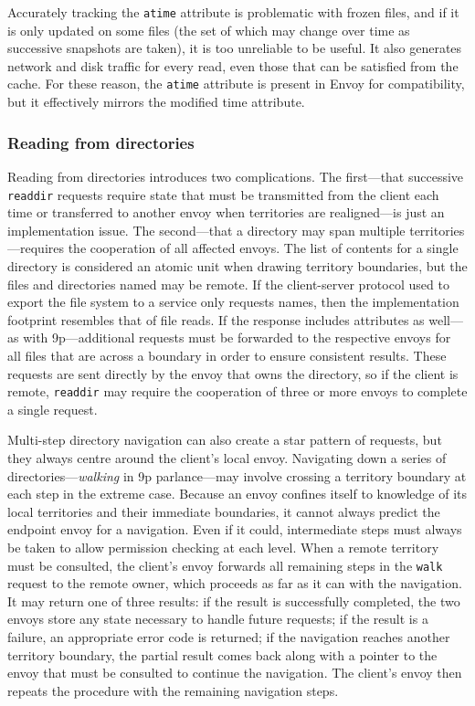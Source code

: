 Accurately tracking the \texttt{atime} attribute is problematic with frozen files, and if it is only updated on some files (the set of which may change over time as successive snapshots are taken), it is too unreliable to be useful. It also generates network and disk traffic for every read, even those that can be satisfied from the cache. For these reason, the \texttt{atime} attribute is present in Envoy for compatibility, but it effectively mirrors the modified time attribute.

\subsubsection{Reading from directories}\label{sec:walk-cache}

Reading from directories introduces two complications. The first---that successive \texttt{readdir} requests require state that must be transmitted from the client each time or transferred to another envoy when territories are realigned---is just an implementation issue. The second---that a directory may span multiple territories---requires the cooperation of all affected envoys. The list of contents for a single directory is considered an atomic unit when drawing territory boundaries, but the files and directories named may be remote. If the client-server protocol used to export the file system to a service only requests names, then the implementation footprint resembles that of file reads. If the response includes attributes as well---as with 9p---additional requests must be forwarded to the respective envoys for all files that are across a boundary in order to ensure consistent results. These requests are sent directly by the envoy that owns the directory, so if the client is remote, \texttt{readdir} may require the cooperation of three or more envoys to complete a single request.

Multi-step directory navigation can also create a star pattern of requests, but they always centre around the client's local envoy. Navigating down a series of directories---\emph{walking} in 9p parlance---may involve crossing a territory boundary at each step in the extreme case. Because an envoy confines itself to knowledge of its local territories and their immediate boundaries, it cannot always predict the endpoint envoy for a navigation. Even if it could, intermediate steps must always be taken to allow permission checking at each level. When a remote territory must be consulted, the client's envoy forwards all remaining steps in the \texttt{walk} request to the remote owner, which proceeds as far as it can with the navigation. It may return one of three results: if the result is successfully completed, the two envoys store any state necessary to handle future requests; if the result is a failure, an appropriate error code is returned; if the navigation reaches another territory boundary, the partial result comes back along with a pointer to the envoy that must be consulted to continue the navigation. The client's envoy then repeats the procedure with the remaining navigation steps.

